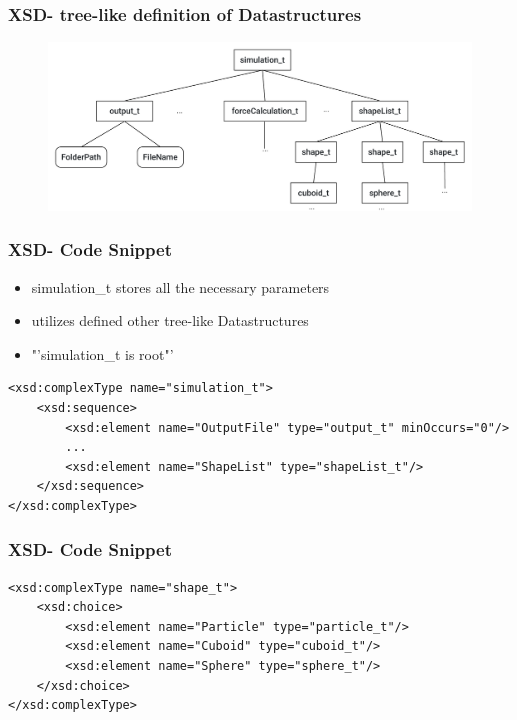 
\begin{frame}
	\frametitle{XSD- tree-like definition of Datastructures}
	\begin{figure}
		\centering
		\includegraphics[width=\linewidth]{xsdScetch}
		\label{fig:xsdscetchtbc}
	\end{figure}
	
	
\end{frame}

\begin{frame}[fragile]
	\frametitle{XSD- Code Snippet}
	\large
	\begin{itemize}
		\item simulation\_t stores all the necessary parameters
		\item utilizes defined other tree-like Datastructures
		\item "'simulation\_t is root"'
	\end{itemize}
	
	\vspace{0.3cm}
	
	\begin{lstlisting}
<xsd:complexType name="simulation_t">
	<xsd:sequence>
		<xsd:element name="OutputFile" type="output_t" minOccurs="0"/>
		...
		<xsd:element name="ShapeList" type="shapeList_t"/>
	</xsd:sequence>
</xsd:complexType>
	\end{lstlisting}
\end{frame}

\begin{frame}[fragile]
	\frametitle{XSD- Code Snippet}
	\large
	\vspace{2cm}
	\begin{lstlisting}
<xsd:complexType name="shape_t">
	<xsd:choice>
		<xsd:element name="Particle" type="particle_t"/>
		<xsd:element name="Cuboid" type="cuboid_t"/>
		<xsd:element name="Sphere" type="sphere_t"/>
	</xsd:choice>
</xsd:complexType>
	\end{lstlisting}
	
\end{frame}


